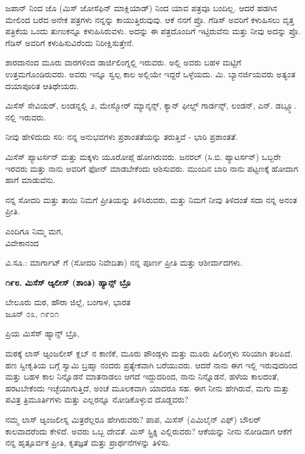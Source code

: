 ಜಪಾನ್ ನಿಂದ ಜೊ (ಮಿಸ್ ಜೋಸೆಫಿನ್ ಮಾಕ್ಲಿಯಾಡ್) ನಿಂದ ಯಾವ ಪತ್ರವೂ ಬಂದಿಲ್ಲ. ಆದರೆ ಹಡಗಿನ ಮೇಲಿಂದ ಬರೆದ ಅನೇಕ ಪತ್ರಗಳು ನನ್ನನ್ನು ಕಾಯುತ್ತಿರುವುವು. ಆಕೆ ನನಗೆ ಪ್ರೊ. ಗೆಡಿಸ್ ಅವರಿಗೆ ಕಳುಹಿಸಲು ವೃತ್ತ ಪತ್ರಿಕೆಯ ಒಂದು ತುಣುಕನ್ನೂ ಕಳುಹಿಸಿರುವಳು. ಅದನ್ನು ಈ ಪತ್ರದೊಂದಿಗೆ ಇಟ್ಟಿರುವೆನು ಮತ್ತು ನೀವು ಅದನ್ನು ಪ್ರೊ. ಗೆಡಿಸ್ ಅವರಿಗೆ ಕಳುಹಿಸುವಿರೆಂದು ನಿರೀಕ್ಷಿಸುತ್ತೇನೆ.

ಶಾರದಾನಂದ ಮೂರು ವಾರಗಳಿಂದ ಡಾರ್ಜಿಲಿಂಗ್ನಲ್ಲಿ ಇರುವರು. ಅಲ್ಲಿ ಅವರು ಬಹಳ ಮಟ್ಟಿಗೆ ಉತ್ತಮಗೊಂಡಿರುವರು. ಅವರು ಇನ್ನೂ ಸ್ವಲ್ಪ ಕಾಲ ಅಲ್ಲಿಯೇ ಇದ್ದರೆ ಒಳ್ಳೆಯದು. ಮಿ. ಬ್ಯಾನರ್ಜಿಯವರು ಅತ್ಯಂತ ದಯಾಪೂರಿತ ಆತಿಥೇಯರು.

ಮಿಸೆಸ್ ಸೇವಿಯರ್, ಲಂಡನ್ನಲ್ಲಿ ೨, ಮೇಸ್ಮೋರ್ ಮ್ಯಾನ್ಶನ್ಸ್, ಕ್ಯಾನ್ ಫೀಲ್ಡ್ ಗಾರ್ಡನ್ಸ್, ಲಂಡನ್, ಎನ್. ಡಬ್ಲ್ಯೂ. ನಲ್ಲಿ ಇರುವರು.

ನೀವು ಹೇಳಿದುದು ಸರಿ: ನನ್ನ ಅನುಭವಗಳು ಪ್ರಶಾಂತತೆಯನ್ನು ತರುತ್ತಿವೆ - ಭಾರಿ ಪ್ರಶಾಂತತೆ.

ಮಿಸೆಸ್ ಪ್ಯಾಟರ್ಸನ್ ಮತ್ತು ಮಕ್ಕಳು ಯೂರೋಪ್ಗೆ ಹೋಗಿರುವರು. ಜನರಲ್ (ಸಿ.ಬಿ. ಪ್ಯಾಟರ್ಸನ್) ಒಬ್ಬರೇ ಇರವರು ಮತ್ತು ನಾನು ಅವರಿಗೆ ಫೋನ್ ಮಾಡಬೇಕೆಂದು ಆಶಿಸುವರು. ಮುಂದಿನ ಬಾರಿ ನಾನು ಪಟ್ಟಣಕ್ಕೆ ಹೋದಾಗ ಹಾಗೆ ಮಾಡುವೆನು.

ನನ್ನ ಸೋದರಿ ಮತ್ತು ತಾಯಿ ನಿಮಗೆ ಪ್ರೀತಿಯನ್ನು ತಿಳಿಸಿರುವರು, ಮತ್ತು ನಿಮಗೆ ನೀವು ತಿಳಿದಂತೆ ಸದಾ ನನ್ನ ಅನಂತ ಪ್ರೀತಿ.

\begin{flushright}
ಎಂದಿಗೂ ನಿಮ್ಮ ಮಗ,\\ವಿವೇಕಾನಂದ
\end{flushright}

ವಿ.ಸೂ.: ಮಾರ್ಗಾಟ್ ಗೆ (ಸೋದರಿ ನಿವೇದಿತಾ) ನನ್ನ ಪೂರ್ಣ ಪ್ರೀತಿ ಮತ್ತು ಆಶೀರ್ವಾದಗಳು.

\begin{center}
\textbf{೧೯೮. ಮಿಸೆಸ್ ಆ್ಯಲೀಸ್ (ಶಾಂತಿ) ಹ್ಯಾನ್ಸ್ ಬ್ರೊ}
\end{center}

\begin{flushright}
ಬೇಲೂರು ಮಠ, ಹೌರಾ ಜಿಲ್ಲೆ, ಬಂಗಾಳ, ಭಾರತ\\ಜೂನ್ ೦೩, ೧೯೦೧
\end{flushright}

ಪ್ರಿಯ ಮಿಸೆಸ್ ಹ್ಯಾನ್ಸ್ ಬ್ರೊ,

ಮಠಕ್ಕೆ ಲಾಸ್ ಆ್ಯಂಜಲೀಸ್ ಕ್ಲಬ್ ನ ಕಾಣಿಕೆ, ಮೂರು ಪೌಂಡ್ಗಳು ಮತ್ತು ಮೂರು ಷಿಲಿಂಗ್ಗಳು ಸರಿಯಾಗಿ ತಲಪಿದೆ. ಹಣ ಸ್ವೀಕೃತಿಯ ಬಗ್ಗೆ ಸ್ವಾಮಿ ಬ್ರಹ್ಮಾ ನಂದರು ಪ್ರತ್ಯೇಕವಾಗಿ ಬರೆಯುವರು. ಆದರೆ ನಾನು ಈಗ ಇಲ್ಲಿ ಇರುವುದರಿಂದ ಮತ್ತು ಬಹಳ ಕಾಲ ನಿನ್ನೊಡನೆ ಮಾತನಾಡಲು ಆಗದೆ ಇದ್ದುದರಿಂದ, ನಾನು ನಿನ್ನೊಡನೆ, ಹಳೆಯ ಕಾಲದಂತೆ, ಹರಟಬೇಕೆಂದು ಇಚ್ಛೆಯಾಗುತ್ತಿದೆ, ಅಂಚೆ ಮೂಲಕವಾಗಿ ಯಾದರೂ ಸಹ. ಈಗ ನೀನು ಹೇಗಿರುವೆ, ಮಗು ಮತ್ತು ಪವಿತ್ರ ತ್ರಿಮೂರ್ತಿಗಳು ಮತ್ತು ಎಲ್ಲರನ್ನೂ ನೋಡಿಕೊಳ್ಳುವ ದೊಡ್ಡವರು?

ನಮ್ಮ ಲಾಸ್ ಆ್ಯಂಜಲೀಸ್ನ ಮಿತ್ರರೆಲ್ಲರೂ ಹೇಗಿರುವರು? ಪಾಪ, ಮಿಸೆಸ್ (ಎಮಿಲೈನ್ ಎಫ್) ಬೌಲರ್ ಕಾಲವಾದರೆಂದು ಕೇಳಿದೆ. ಅವರು ಒಬ್ಬ ದೇವತೆ. ಮಿಸ್ ಸ್ಟ್ರಿಕ್ನಿ ಎಲ್ಲಿರುವರು? ಆಕೆಯನ್ನು ನೀನು ನೋಡಿದಾಗ ಆಕೆಗೆ ನನ್ನ ಹೃತ್ಪೂರ್ವಕ ಪ್ರೀತಿ, ಕೃತಜ್ಞತೆ ಮತ್ತು ಪ್ರಾರ್ಥನೆಗಳನ್ನು ತಿಳಿಸು.

